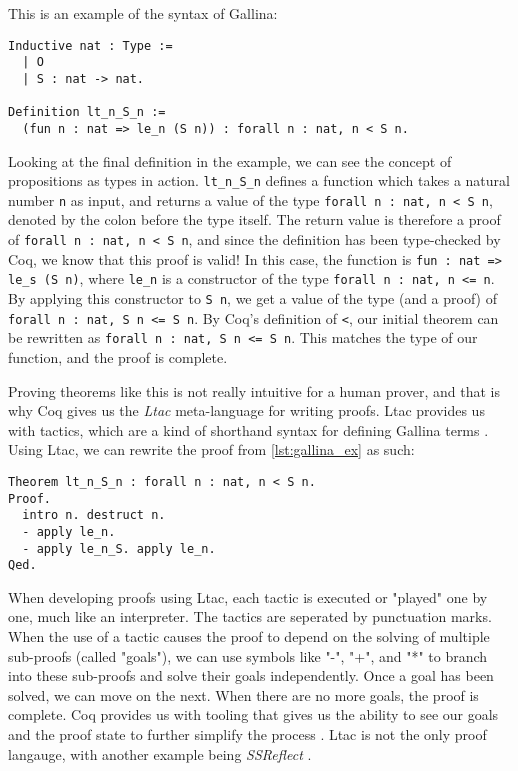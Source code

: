 This is an example of the syntax of Gallina:

\begin{minipage}{\linewidth}
\begin{lstlisting}[language=Coq, label={lst:gallina_ex}, caption={Example of Gallina syntax}]
Inductive nat : Type :=
  | O
  | S : nat -> nat.

Definition lt_n_S_n :=
  (fun n : nat => le_n (S n)) : forall n : nat, n < S n.
\end{lstlisting}
\end{minipage}

Looking at the final definition in the example, we can see the
concept of propositions as types in action.
\lstinline{lt_n_S_n} defines a function which takes a natural number \lstinline{n}
as input, and returns a value of the type \lstinline{forall n : nat, n < S n},
denoted by the colon before the type itself.
The return value is therefore a proof of \lstinline{forall n : nat, n < S n}, and since
the definition has been type-checked by Coq, we know that this proof is valid!
In this case, the function is
\lstinline{fun : nat => le_s (S n)}, where \lstinline{le_n} is a constructor
of the type \lstinline{forall n : nat, n <= n}. By applying this constructor
to \lstinline{S n}, we get a value of the type (and a proof) of
\lstinline{forall n : nat, S n <= S n}. By Coq's definition of \lstinline{<},
our initial theorem can be rewritten as \lstinline{forall n : nat, S n <= S n}.
This matches the type of our function, and the proof is complete.

Proving theorems like this is not really intuitive for a human prover,
and that is why Coq gives us the \textit{Ltac} meta-language for writing proofs.
Ltac provides us with tactics, which are a kind of shorthand syntax for defining Gallina terms \cite{cltac}.
Using Ltac, we can rewrite the proof from \ref{lst:gallina_ex} as such:

\begin{minipage}{\linewidth}
\begin{lstlisting}[language=Coq, label={lst:ltac_ex}, caption={Example of Ltac syntax}]
Theorem lt_n_S_n : forall n : nat, n < S n.
Proof.
  intro n. destruct n.
  - apply le_n.
  - apply le_n_S. apply le_n.
Qed.
\end{lstlisting}
\end{minipage}

When developing proofs using Ltac, each tactic is executed or "played" one by one,
much like an interpreter. The tactics are seperated by punctuation marks.
When the use of a tactic causes the proof to depend on the solving of multiple sub-proofs (called "goals"),
we can use symbols like "-", "+", and "*" to branch into these sub-proofs and solve their goals independently.
Once a goal has been solved, we can move on the next. When there are no more goals, the proof is complete.
Coq provides us with tooling that gives us the ability to see our goals and the proof state
to further simplify the process \cite{cide}.
Ltac is not the only proof langauge, with another example being \textit{SSReflect} \cite{cssr}.


